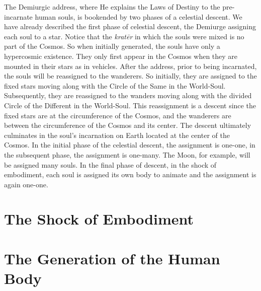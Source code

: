 The Demiurgic address, where He explains the Laws of Destiny to the pre-incarnate human souls, is bookended by two phases of a celestial descent. We have already described the first phase of celestial descent, the Demiurge assigning each soul to a star. Notice that the \emph{kratēr} in which the souls were mixed is no part of the Cosmos. So when initially generated, the souls have only a hypercosmic existence. They only first appear in the Cosmos when they are mounted in their stars as in vehicles. After the address, prior to being incarnated, the souls will be reassigned to the wanderers. So initially, they are assigned to the fixed stars moving along with the Circle of the Same in the World-Soul. Subsequently, they are reassigned to the wanders moving along with the divided Circle of the Different in the World-Soul. This reassignment is a descent since the fixed stars are at the circumference of the Cosmos, and the wanderers are between the circumference of the Cosmos and its center. The descent ultimately culminates in the soul's incarnation on Earth located at the center of the Cosmos. In the initial phase of the celestial descent, the assignment is one-one, in the subsequent phase, the assignment is one-many. The Moon, for example, will be assigned many souls. In the final phase of descent, in the shock of embodiment, each soul is assigned its own body to animate and the assignment is again one-one.


\section{The Shock of Embodiment} %
\label{sec:the_shock_of_embodiment}




\section{The Generation of the Human Body} %
\label{sec:structuring_the_human_body}





